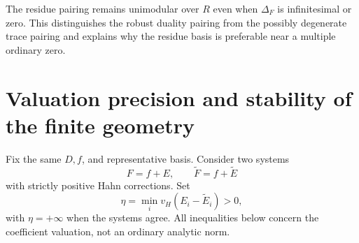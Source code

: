 \documentclass[11pt,letterpaper]{article}
\theoremstyle{definition}
\theoremstyle{remark}
\newcommand{\vH}{v_H}
\numberwithin{equation}{section}
\begin{document}
The residue pairing remains unimodular over $R$ even when $\Delta_F$ is infinitesimal or zero. This distinguishes the robust duality pairing from the possibly degenerate trace pairing and explains why the residue basis is preferable near a multiple ordinary zero.

\section{Valuation precision and stability of the finite geometry}\label{sec:precision}
Fix the same $D,f$, and representative basis. Consider two systems
\[
 F=f+E,\qquad \widetilde F=f+\widetilde E
\]
with strictly positive Hahn corrections. Set
\[
 \eta=\min_i\vH(E_i-\widetilde E_i)>0,
\]
with $\eta=+\infty$ when the systems agree. All inequalities below concern the coefficient valuation, not an ordinary analytic norm.
\end{document}
